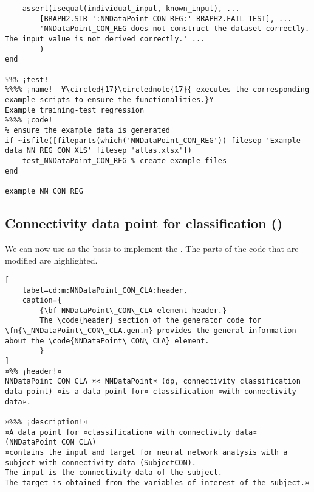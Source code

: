 \documentclass{tufte-handout}
\begin{document}
\begin{lstlisting}
    assert(isequal(individual_input, known_input), ...
        [BRAPH2.STR ':NNDataPoint_CON_REG:' BRAPH2.FAIL_TEST], ...
        'NNDataPoint_CON_REG does not construct the dataset correctly. The input value is not derived correctly.' ...
        )
end

%%% ¡test! 
%%%% ¡name!  ¥\circled{17}\circlednote{17}{ executes the corresponding example scripts to ensure the functionalities.}¥
Example training-test regression
%%%% ¡code!
% ensure the example data is generated
if ~isfile([fileparts(which('NNDataPoint_CON_REG')) filesep 'Example data NN REG CON XLS' filesep 'atlas.xlsx'])
    test_NNDataPoint_CON_REG % create example files
end

example_NN_CON_REG

\end{lstlisting}

\clearpage

\subsection{Connectivity data point for classification ()}

We can now use  as the basis to implement the .
The parts of the code that are modified are highlighted. 

\begin{lstlisting}[
	label=cd:m:NNDataPoint_CON_CLA:header,
	caption={
		{\bf NNDataPoint\_CON\_CLA element header.}
		The \code{header} section of the generator code for \fn{\_NNDataPoint\_CON\_CLA.gen.m} provides the general information about the \code{NNDataPoint\_CON\_CLA} element.
		}
]
¤%% ¡header!¤
NNDataPoint_CON_CLA ¤< NNDataPoint¤ (dp, connectivity classification data point) ¤is a data point for¤ classification ¤with connectivity data¤.

¤%%% ¡description!¤
¤A data point for ¤classification¤ with connectivity data¤ (NNDataPoint_CON_CLA) 
¤contains the input and target for neural network analysis with a subject with connectivity data (SubjectCON).
The input is the connectivity data of the subject.
The target is obtained from the variables of interest of the subject.¤
\end{lstlisting}
\end{document}
